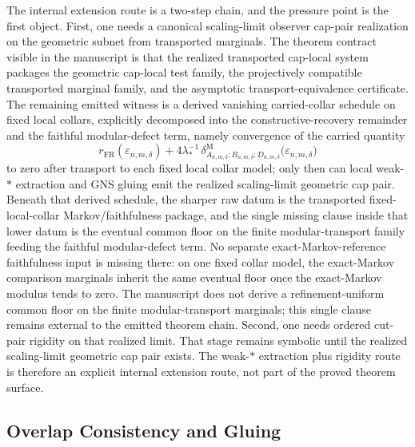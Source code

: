 The internal extension route is a two-step chain, and the pressure point is the first object. First, one needs a canonical scaling-limit observer cap-pair realization on the geometric subnet from transported marginals. The theorem contract visible in the manuscript is that the realized transported cap-local system packages the geometric cap-local test family, the projectively compatible transported marginal family, and the asymptotic transport-equivalence certificate. The remaining emitted witness is a derived vanishing carried-collar schedule on fixed local collars, explicitly decomposed into the constructive-recovery remainder and the faithful modular-defect term, namely convergence of the carried quantity
\[
r_{\mathrm{FR}}(\varepsilon_{n,m,\delta})
+
4\lambda_\ast^{-1}\,
\delta^{\mathrm M}_{A_{n,m,\delta}:B_{n,m,\delta}:D_{n,m,\delta}}
\bigl(\varepsilon_{n,m,\delta}\bigr)
\]
to zero after transport to each fixed local collar model; only then can local weak-\(*\) extraction and GNS gluing emit the realized scaling-limit geometric cap pair. Beneath that derived schedule, the sharper raw datum is the transported fixed-local-collar Markov/faithfulness package, and the single missing clause inside that lower datum is the eventual common floor on the finite modular-transport family feeding the faithful modular-defect term. No separate exact-Markov-reference faithfulness input is missing there: on one fixed collar model, the exact-Markov comparison marginals inherit the same eventual floor once the exact-Markov modulus tends to zero. The manuscript does not derive a refinement-uniform common floor on the finite modular-transport marginals; this single clause remains external to the emitted theorem chain. Second, one needs ordered cut-pair rigidity on that realized limit. That stage remains symbolic until the realized scaling-limit geometric cap pair exists. The weak-\(*\) extraction plus rigidity route is therefore an explicit internal extension route, not part of the proved theorem surface.
\subsection{Overlap Consistency and Gluing}\label{3-overlap-consistency-and-gluing}

